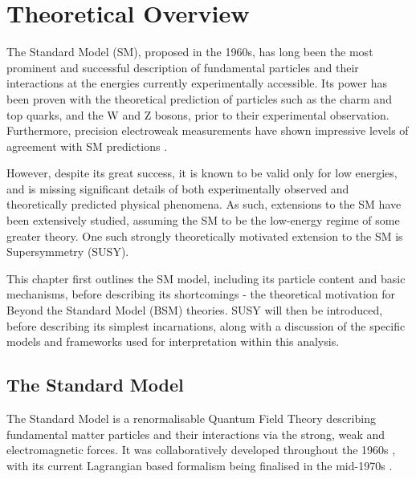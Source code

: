 
\chapter{Theoretical Overview}
\label{ch:theory}

\ifpdf
    \graphicspath{{Chapter2/Figs/Raster/}{Chapter2/Figs/PDF/}{Chapter2/Figs/}}
\else
    \graphicspath{{Chapter2/Figs/Vector/}{Chapter2/Figs/}}
\fi



The Standard Model (SM), proposed in the 1960s, has long been the most prominent and
successful description of fundamental particles and their interactions at the
energies currently experimentally accessible. Its power has been proven with the 
theoretical prediction of particles such as the charm and top quarks, and the W
and Z bosons, prior to their experimental observation. Furthermore, precision 
electroweak measurements have shown impressive levels of  agreement with SM
predictions \cite{ALEPH:2010aa}.

However, despite its great success, it is known to be valid only for low 
energies, and is missing significant details of both experimentally 
observed and theoretically predicted physical phenomena. As such, extensions to
the SM have been extensively studied, assuming the SM to be the low-energy 
regime of some greater theory. One such strongly theoretically motivated
extension to the SM is Supersymmetry (SUSY).

This chapter first outlines the SM model, including its particle content and basic 
mechanisms, before describing its shortcomings - the theoretical 
motivation for Beyond the Standard Model (BSM) theories. SUSY will then be 
introduced, before describing its simplest incarnations, along with a discussion
of the specific models and frameworks used for interpretation within this
analysis.

\section{The Standard Model}
\label{sec:theory_current}

The Standard Model is a renormalisable Quantum Field Theory describing
fundamental matter particles and their interactions via the strong,
weak and electromagnetic forces. It was collaboratively developed throughout the
1960s \cite
{Glashow1961579,PhysRevLett.19.1264,Salam:1968rm,PhysRevLett.30.1346,PhysRevLett.30.1343}, with its current Lagrangian
based formalism being finalised in the mid-1970s \cite{martinAndShaw}.

